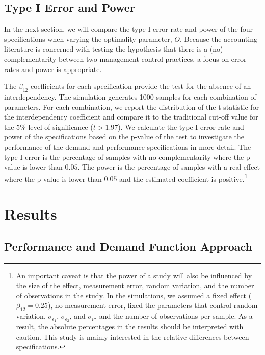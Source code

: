 \documentclass[12pt]{article}
\begin{document}
\subsection{Type I Error and Power}
In the next section, we will compare the type I error rate and power of the four specifications when varying the optimality parameter, $O$. Because the accounting literature is concerned with testing the hypothesis that there is a (no) complementarity between two management control practices, a focus on error rates and power is appropriate. 

The $\beta_{12}$ coefficients for each specification provide the test for the absence of an interdependency. The simulation generates 1000 samples for each combination of parameters. For each combination, we report the distribution of the t-statistic for the interdependency coefficient and compare it to the traditional cut-off value for the $5\%$ level of significance ($t > 1.97$). We calculate the type I error rate and power of the specifications based on the p-value of the test to investigate the performance of the demand and performance specifications in more detail. The type I error is the percentage of samples with no complementarity where the p-value is lower than $0.05$. The power is the percentage of samples with a real effect where the p-value is lower than $0.05$ and the estimated coefficient is positive.\footnote{An important caveat is that the power of a study will also be influenced by the size of the effect, measurement error, random variation, and the number of observations in the study. In the simulations, we assumed a fixed effect ($\beta_{12} = 0.25$), no measurement error, fixed the parameters that control random variation, $\sigma_{\epsilon_1}$, $\sigma_{\epsilon_2}$, and $\sigma_{\nu}$, and the number of observations per sample. As a result, the absolute percentages in the results should be interpreted with caution. This study is mainly interested in the relative differences between specifications.}

\section{Results}
\subsection{Performance and Demand Function
Approach}\label{performance-and-demand-function-approach}
\end{document}
